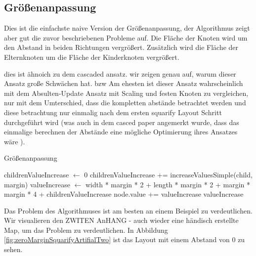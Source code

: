\subsection{Größenanpassung}
Dies ist die einfachste naive Version der Größenanpassung, der Algorithmus zeigt aber gut die zuvor beschriebenen Probleme auf. Die Fläche der Knoten wird um den Abstand in beiden Richtungen vergrößert. Zusätzlich wird die Fläche der Elternknoten um die Fläche der Kinderknoten vergrößert. 

dies ist ähnoich zu dem cascaded ansatz. wir zeigen genau auf, warum dieser Ansatz große Schwächen hat. bzw 
Am ehesten ist dieser Ansatz wahrscheinlich mit dem Absulten-Update Ansatz mit Scaling und festen Knoten zu vergleichen, nur mit dem Umterschied, dass die kompletten abstände betrachtet werden und diese betrachtung nur einmalig nach dem ersten squarify Layout Schritt durchgeführt wird (was auch in dem casced paper angemerkt wurde, dass das einmalige berechnen der Abstände eine mögliche Optimierung ihres Ansatzes wäre \cite[6]{lu2008cascaded}).


\begin{algorithm}[H]
\caption{Größenanpassung}
\label{alg:EinfacheGrößenanpassung}
\begin{algorithmic}[1]
    \State childrenValueIncrease $\gets$ 0
            \State childrenValueIncrease += increaseValuesSimple(child, margin)
        \EndFor
    \EndIf
    \State valueIncrease $\gets$ width * margin * 2 + length * margin * 2 + margin * margin * 4 + childrenValueIncrease
    \State node.value += valueIncrease
    \State \Return valueIncrease
\EndFunction
\end{algorithmic}
\end{algorithm}

Das Problem des Algorithmuses ist am besten an einem Beispiel zu verdeutlichen. Wir visualieren den ZWITEN AnHANG - auch wieder eine händisch erstellte Map, um das Problem zu verdeutlichen. In Abbildung \ref{fig:zeroMarginSquarifyArtifialTwo} ist das Layout mit einem Abstand von 0 zu sehen. 

